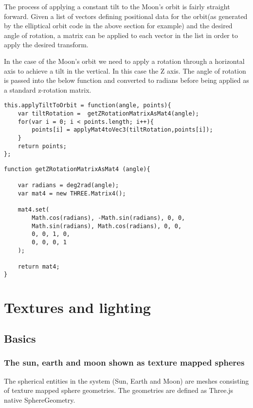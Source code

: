\documentclass[titlepage]{article}
\begin{document}
The process of applying a constant tilt to the Moon's orbit is fairly straight forward. Given a list of vectors defining positional data for the orbit(as generated by the elliptical orbit code in the above section for example) and the desired angle of rotation, a matrix can be applied to each vector in the list in order to apply the desired transform.

In the case of the Moon's orbit we need to apply a rotation through a horizontal axis to achieve a tilt in the vertical. In this case the Z axis. The angle of rotation is passed into the below function and converted to radians before being applied as a standard z-rotation matrix. 
\begin{lstlisting}[caption=Above code can be found in OrbitUtils.js]
this.applyTiltToOrbit = function(angle, points){
    var tiltRotation =  getZRotationMatrixAsMat4(angle);
    for(var i = 0; i < points.length; i++){
        points[i] = applyMat4toVec3(tiltRotation,points[i]);
    }
    return points;
};
\end{lstlisting}

\begin{lstlisting}[caption=Definition of a rotation matrix in the Z axis. Can be found in MatrixUtils.js]
function getZRotationMatrixAsMat4 (angle){

    var radians = deg2rad(angle);
    var mat4 = new THREE.Matrix4();
    
    mat4.set(
        Math.cos(radians), -Math.sin(radians), 0, 0,
        Math.sin(radians), Math.cos(radians), 0, 0,
        0, 0, 1, 0,
        0, 0, 0, 1
    );
    
    return mat4;
}

\end{lstlisting}


\section{Textures and lighting}

\subsection{Basics}
\subsubsection{The sun, earth and moon shown as texture mapped spheres}

The spherical entities in the system (Sun, Earth and Moon) are meshes consisting of texture mapped sphere geometries. The geometries are defined as Three.js native SphereGeometry.
\end{document}
